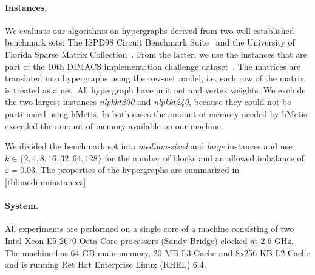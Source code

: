 \documentclass[runningheads,a4paper]{llncs}
\begin{document}
\paragraph{Instances.} \label{Instances}
We evaluate our algorithms on hypergraphs derived from two well established benchmark sets: The ISPD98 Circuit Benchmark Suite~\cite{ISPD98} and
the University of Florida Sparse Matrix Collection~\cite{FloridaSPM}. From the latter, we use the instances that are part of the 10th DIMACS implementation challenge dataset~\cite{benchmarksfornetworksanalysis}. The matrices are translated into hypergraphs using the row-net model, i.e. each row of the matrix
is treated as a net. All hypergraph have unit net and vertex weights. We exclude the two largest instances \emph{nlpkkt200} and \emph{nlpkkt240}, because they could not 
be partitioned using hMetis. In both cases the amount of memory needed by hMetis exceeded the amount of memory available on our machine.

We divided the benchmark set into \emph{medium-sized} and \emph{large} instances and use $k \in \{2,4,8,16,32,64,128\}$ for the number of blocks and an allowed imbalance of $\varepsilon = 0.03$.
The properties of the hypergraphs are summarized in \autoref{tbl:mediuminstances}. 

\paragraph{System.}
All experiments are performed on a single core of a machine consisting of two Intel Xeon E5-2670 Octa-Core processors (Sandy Bridge) 
clocked at $2.6$ GHz. The machine has $64$ GB main memory, $20$ MB L3-Cache and 8x256 KB L2-Cache and is running Ret Hat Enterprise Linux (RHEL) 6.4.
\end{document}
